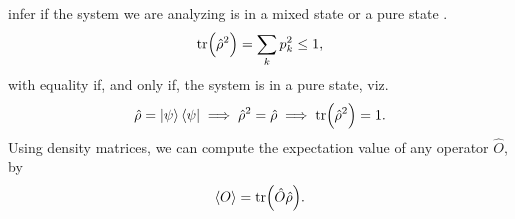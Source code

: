         infer if the system we are analyzing is in a mixed state or a pure state
        \cite{modern-qm}.
        \begin{align}
            \tr(\hat{\rho}^2) = \sum_{k} p_k^2 \leq 1,
        \end{align}
        with equality if, and only if, the system is in a pure state, viz.
        \begin{align}
            \hat{\rho} = \ket{\psi}\bra{\psi}
            \implies \hat{\rho}^2 = \hat{\rho}
            \implies \tr(\hat{\rho}^2) = 1.
        \end{align}
        Using density matrices, we can compute the expectation value of any
        operator $\hat{O}$, by \cite{modern-qm}
        \begin{align}
            \expval{O} = \tr(\hat{O}\hat{\rho}).
        \end{align}


